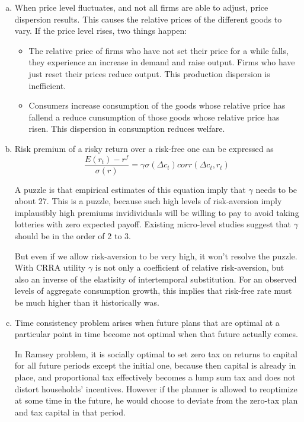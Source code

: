 \documentclass{article}
\begin{document}
\begin{enumerate}[(a)]
\item When price level fluctuates, and not all firms are able to
  adjust, price dispersion results. This causes the relative prices of
  the different goods to vary. If the price level rises, two things
  happen:
  \begin{itemize}
  \item The relative price of firms who have not set their price for a
    while falls, they experience an increase in demand and raise
    output. Firms who have just reset their prices reduce output. This
    production dispersion is inefficient.
  \item Consumers increase consumption of the goods whose relative
    price has fallend a reduce cunsumption of those goods whose
    relative price has risen. This dispersion in consumption reduces
    welfare.
  \end{itemize}

\item Risk premium of a risky return over a risk-free one can be expressed as
  \begin{equation*}
    \frac{E(r_t)-r^f}{\sigma(r)}=\gamma\sigma(\Delta c_t)corr(\Delta c_t,r_t)
  \end{equation*}

  A puzzle is that empirical estimates of this equation imply that
  $\gamma$ needs to be about 27. This is a puzzle, because such high
  levels of risk-aversion imply implausibly high premiums
  invidividuals will be willing to pay to avoid taking lotteries with
  zero expected payoff. Existing micro-level studies suggest that
  $\gamma$ should be in the order of 2 to 3.

  But even if we allow risk-aversion to be very high, it won't resolve
  the puzzle. With CRRA utility $\gamma$ is not only a coefficient of
  relative risk-aversion, but also an inverse of the elastisity of
  intertemporal substitution. For an observed levels of aggregate
  consumption growth, this implies that risk-free rate must be much
  higher than it historically was.

\item Time consistency problem arises when future plans that are
  optimal at a particular point in time become not optimal when that
  future actually comes.

  In Ramsey problem, it is socially optimal to set zero tax on returns
  to capital for all future periods except the initial one, because
  then capital is already in place, and proportional tax effectively
  becomes a lump sum tax and does not distort households'
  incentives. However if the planner is allowed to reoptimize at some
  time in the future, he would choose to deviate from the zero-tax
  plan and tax capital in that period.

\end{enumerate}
\end{document}

